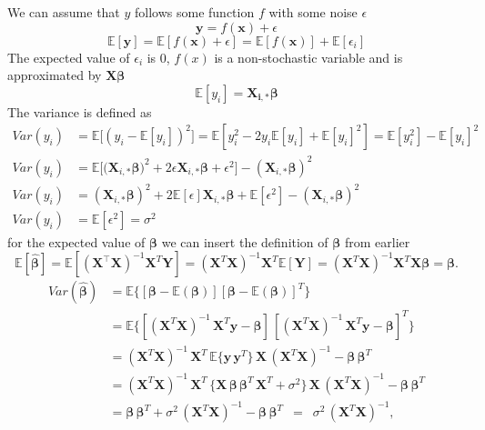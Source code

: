 \documentclass[twoside,11pt]{report}
\begin{document}
We can assume that $y$ follows some function $f$ with some noise $\epsilon$
$$
\mathbf{y} = f(\mathbf{x}) + \epsilon
$$
$$
\mathbb{E}[\mathbf{y}] = \mathbb{E}[f(\mathbf{x} )+ \epsilon] = \mathbb{E}[f(\mathbf{x})] + \mathbb{E}[\epsilon_i]
$$
The expected value of $\epsilon_i$ is $0$, $f(x)$ is a non-stochastic variable and is approximated by $\boldsymbol{X}\boldsymbol{\beta}$
$$
\mathbb{E}[y_i] = \boldsymbol{X_{i,*}}\boldsymbol{\beta}
$$
The variance is defined as
\begin{align*}
Var(y_i) &= \mathbb{E}\big[(y_i - \mathbb{E}[y_i])^2\big] = \mathbb{E}\left[y_i^2 - 2y_i\mathbb{E}[y_i] + \mathbb{E}[y_i]^2\right] = \mathbb{E}[y_i^2] - \mathbb{E}[y_i]^2\\
Var(y_i) &= \mathbb{E}\big[\big(\boldsymbol{X}_{i,*}\boldsymbol{\beta}\big)^2 + 2\epsilon \boldsymbol{X}_{i,*}\boldsymbol{\beta} + \epsilon^2 \big] - (\boldsymbol{X}_{i,*}\boldsymbol{\beta})^2\\
Var(y_i) &= (\boldsymbol{X}_{i,*}\boldsymbol{\beta})^2 + 2\mathbb{E}[\epsilon]\boldsymbol{X}_{i,*}\boldsymbol{\beta} + \mathbb{E}[\epsilon^2] - (\boldsymbol{X}_{i,*}\boldsymbol{\beta})^2\\
Var(y_i) &= \mathbb{E}[\epsilon^2] = \sigma^2
\end{align*}
for the expected value of $\boldsymbol{\beta}$ we can insert the definition of $\boldsymbol{\beta}$ from earlier
$$
\mathbb{E}[\boldsymbol{\hat{\beta}}] = \mathbb{E}[ (\mathbf{X}^{\top} \mathbf{X})^{-1}\mathbf{X}^{T} \mathbf{Y}]=(\mathbf{X}^{T} \mathbf{X})^{-1}\mathbf{X}^{T} \mathbb{E}[ \mathbf{Y}]=(\mathbf{X}^{T} \mathbf{X})^{-1} \mathbf{X}^{T}\mathbf{X}\boldsymbol{\beta}=\boldsymbol{\beta}.
$$
\begin{align*}
Var(\boldsymbol{\hat{\beta}}) & = \mathbb{E} \{ [\boldsymbol{\beta} - \mathbb{E}(\boldsymbol{\beta})] [\boldsymbol{\beta} - \mathbb{E}(\boldsymbol{\beta})]^{T} \}
\\
& = \mathbb{E} \{ [(\mathbf{X}^{T} \mathbf{X})^{-1} \, \mathbf{X}^{T} \mathbf{y} - \boldsymbol{\beta}] \, [(\mathbf{X}^{T} \mathbf{X})^{-1} \, \mathbf{X}^{T} \mathbf{y} - \boldsymbol{\beta}]^{T} \}
\\
& = (\mathbf{X}^{T} \mathbf{X})^{-1} \, \mathbf{X}^{T} \, \mathbb{E} \{ \mathbf{y} \, \mathbf{y}^{T} \} \, \mathbf{X} \, (\mathbf{X}^{T} \mathbf{X})^{-1} - \boldsymbol{\beta} \, \boldsymbol{\beta}^{T}
\\
& = (\mathbf{X}^{T} \mathbf{X})^{-1} \, \mathbf{X}^{T} \, \{ \mathbf{X} \, \boldsymbol{\beta} \, \boldsymbol{\beta}^{T} \,  \mathbf{X}^{T} + \sigma^2 \} \, \mathbf{X} \, (\mathbf{X}^{T} \mathbf{X})^{-1} - \boldsymbol{\beta} \, \boldsymbol{\beta}^{T}
\\
& = \boldsymbol{\beta} \, \boldsymbol{\beta}^{T}  + \sigma^2 \, (\mathbf{X}^{T} \mathbf{X})^{-1} - \boldsymbol{\beta} \, \boldsymbol{\beta}^{T}
\, \, \, = \, \, \, \sigma^2 \, (\mathbf{X}^{T} \mathbf{X})^{-1},
\end{align*}
\end{document}
